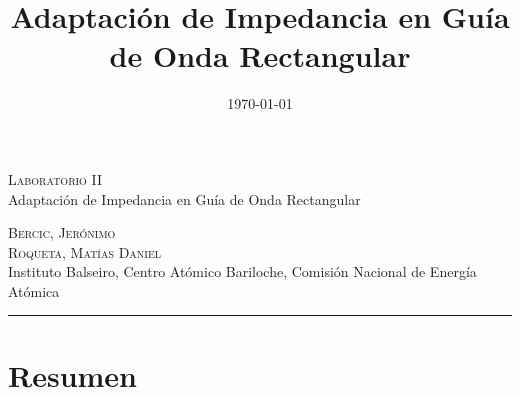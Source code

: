\documentclass[11pt,a4paper]{article}
\date{\small{\today}}
\begin{document}
\title{Adaptación de Impedancia en Guía de Onda Rectangular}
	\LARGE{\textsc{Laboratorio II}}\\
	\Large{Adaptación de Impedancia en Guía de Onda Rectangular}\\
\begin{large}
\small\textsc{Bercic, Jerónimo}\\
\small\textsc{Roqueta, Matías Daniel}\\
\small{Instituto Balseiro, Centro Atómico Bariloche, Comisión Nacional de Energía Atómica}\\
\end{large}
\setcounter{page}{1}

\chead{}

\rfoot{\thepage} 
\renewcommand{\headrulewidth}{0.4pt} 
\renewcommand{\footrulewidth}{0.4pt} 
\pagestyle{fancy}

\hrule
\normalsize
\section{Resumen}
\end{document}
